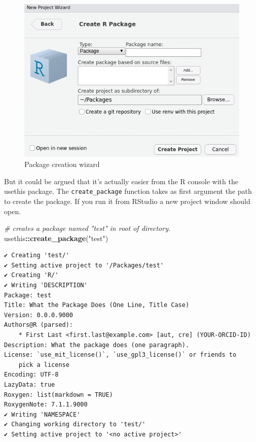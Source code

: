 \documentclass[
]{krantz}
\makeatletter
\newenvironment{Shaded}{\begin{snugshade}}{\end{snugshade}}
\newcommand{\CommentTok}[1]{\textcolor[rgb]{0.37,0.37,0.37}{\textit{#1}}}
\newcommand{\KeywordTok}[1]{\textcolor[rgb]{0.27,0.27,0.27}{\textbf{#1}}}
\newcommand{\NormalTok}[1]{#1}
\newcommand{\OperatorTok}[1]{\textcolor[rgb]{0.43,0.43,0.43}{\textbf{#1}}}
\newcommand{\StringTok}[1]{\textcolor[rgb]{0.5,0.5,0.5}{#1}}
\newenvironment{kframe}{%
\medskip{}
\setlength{\fboxsep}{.8em}
 \def\at@end@of@kframe{}%
 \ifinner\ifhmode%
  \def\at@end@of@kframe{\end{minipage}}%
  \begin{minipage}{\columnwidth}%
 \fi\fi%
 \def\FrameCommand##1{\hskip\@totalleftmargin \hskip-\fboxsep
 \colorbox{shadecolor}{##1}\hskip-\fboxsep
     \hskip-\linewidth \hskip-\@totalleftmargin \hskip\columnwidth}%
 \MakeFramed {\advance\hsize-\width
   \@totalleftmargin\z@ \linewidth\hsize
   \@setminipage}}%
 {\par\unskip\endMakeFramed%
 \at@end@of@kframe}
\renewenvironment{Shaded}{\begin{kframe}}{\end{kframe}}
\makeatother
\begin{document}
\begin{figure}
\centering
\includegraphics{images/rstudio-create-package.png}
\caption{Package creation wizard}
\end{figure}

But it could be argued that it's actually easier from the R console with the usethis package. The \texttt{create\_package} function takes as first argument the path to create the package. If you run it from RStudio a new project window should open.

\begin{Shaded}
\begin{Highlighting}[]
\CommentTok{\# creates a package named "test" in root of directory.}
\NormalTok{usethis}\OperatorTok{::}\KeywordTok{create\_package}\NormalTok{(}\StringTok{"test"}\NormalTok{)}
\end{Highlighting}
\end{Shaded}

\begin{verbatim}
✔ Creating 'test/'
✔ Setting active project to '/Packages/test'
✔ Creating 'R/'
✔ Writing 'DESCRIPTION'
Package: test
Title: What the Package Does (One Line, Title Case)
Version: 0.0.0.9000
Authors@R (parsed):
    * First Last <first.last@example.com> [aut, cre] (YOUR-ORCID-ID)
Description: What the package does (one paragraph).
License: `use_mit_license()`, `use_gpl3_license()` or friends to
    pick a license
Encoding: UTF-8
LazyData: true
Roxygen: list(markdown = TRUE)
RoxygenNote: 7.1.1.9000
✔ Writing 'NAMESPACE'
✔ Changing working directory to 'test/'
✔ Setting active project to '<no active project>'
\end{verbatim}
\end{document}
